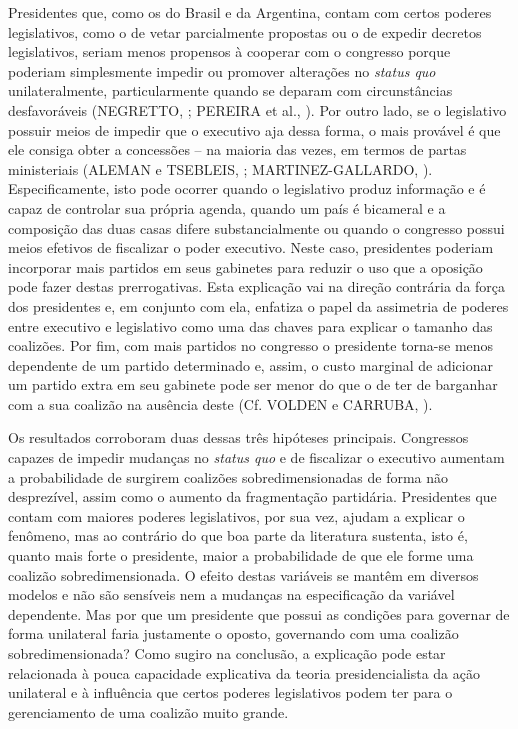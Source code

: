 Presidentes que, como os do Brasil e da Argentina, contam com certos poderes legislativos, como o de vetar parcialmente propostas ou o de expedir decretos legislativos, seriam menos propensos à cooperar com o congresso porque poderiam simplesmente impedir ou promover alterações no \textit{status quo} unilateralmente, particularmente quando se deparam com circunstâncias desfavoráveis (NEGRETTO, \citeyear{negretto2006}; PEREIRA et al., \citeyear{pereira2005}). Por outro lado, se o legislativo possuir meios de impedir que o executivo aja dessa forma, o mais provável é que ele consiga obter a concessões -- na maioria das vezes, em termos de partas ministeriais (ALEMAN e TSEBLEIS, \citeyear{aleman2011}; MARTINEZ-GALLARDO, \citeyear{martinez2012}). Especificamente, isto pode ocorrer quando o legislativo produz informação e é capaz de controlar sua própria agenda, quando um país é bicameral e a composição das duas casas difere substancialmente ou quando o congresso possui meios efetivos de fiscalizar o poder executivo. Neste caso, presidentes poderiam incorporar mais partidos em seus gabinetes para reduzir o uso que a oposição pode fazer destas prerrogativas. Esta explicação vai na direção contrária da força dos presidentes e, em conjunto com ela, enfatiza o papel da assimetria de poderes entre executivo e legislativo como uma das chaves para explicar o tamanho das coalizões. Por fim, com mais partidos no congresso o presidente torna-se menos dependente de um partido determinado e, assim, o custo marginal de adicionar um partido extra em seu gabinete pode ser menor do que o de ter de barganhar com a sua coalizão na ausência deste (Cf. VOLDEN e CARRUBA, \citeyear{volden2004}).

Os resultados corroboram duas dessas três hipóteses principais. Congressos capazes de impedir mudanças no \textit{status quo} e de fiscalizar o executivo aumentam a probabilidade de surgirem coalizões sobredimensionadas de forma não desprezível, assim como o aumento da fragmentação partidária. Presidentes que contam com maiores poderes legislativos, por sua vez, ajudam a explicar o fenômeno, mas ao contrário do que boa parte da literatura sustenta, isto é, quanto mais forte o presidente, maior a probabilidade de que ele forme uma coalizão sobredimensionada. O efeito destas variáveis se mantêm em diversos modelos e não são sensíveis nem a mudanças na especificação da variável dependente. Mas por que um presidente que possui as condições para governar de forma unilateral faria justamente o oposto, governando com uma coalizão sobredimensionada? Como sugiro na conclusão, a explicação pode estar relacionada à pouca capacidade explicativa da teoria presidencialista da ação unilateral e à influência que certos poderes legislativos podem ter para o gerenciamento de uma coalizão muito grande.

